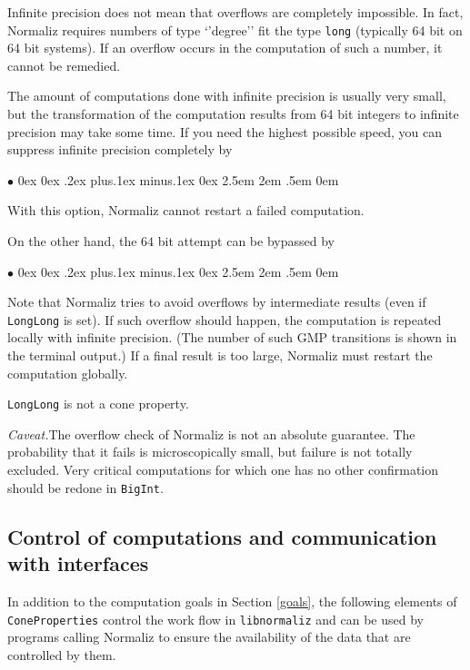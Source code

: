 \documentclass[12pt,a4paper]{scrartcl}
\newcommand{\stdli}{ \topsep0ex \partopsep0ex %
\parsep.2ex plus.1ex minus.1ex \itemsep0ex%
\leftmargin2.5em \labelwidth2em \labelsep.5em \rightmargin0em}%
\renewenvironment{itemize}{\begin{list}{{$\bullet$}}{\stdli}}{\end{list}}
\theoremstyle{definition}
\def\itemtt[#1]{\item[\textbf{\ttt{#1}}]}
\def\ttt{\texttt}
\begin{document}
Infinite precision does not mean that overflows are completely impossible. In fact, Normaliz requires numbers of type `'degree'' fit the type \verb|long| (typically 64 bit on 64 bit systems). If an overflow occurs in the computation of such a number, it cannot be remedied.

The amount of computations done with infinite precision is usually very small, but the transformation of the computation results from 64 bit integers to infinite precision may take some time. If you need the highest possible speed, you can suppress infinite precision completely by 
\begin{itemize}
	\itemtt[LongLong]	
\end{itemize}
With this option, Normaliz cannot restart a failed computation.

On the other hand, the $64$ bit attempt can be bypassed by
\begin{itemize}
	\itemtt[BigInt, -B]	
\end{itemize}

Note that Normaliz tries to avoid overflows by intermediate results (even if \verb|LongLong| is set). If such overflow should happen, the computation is repeated locally with infinite precision. (The number of such GMP transitions is shown in the terminal output.) If a final result is too large, Normaliz must restart the computation globally.

\verb|LongLong| is  not a cone property.

\emph{Caveat.}\enspace The overflow check of Normaliz is not an absolute guarantee. The probability that it fails is microscopically small, but failure is not totally excluded. Very critical computations for which one has no other confirmation should be redone in \verb|BigInt|.

\subsection{Control of computations and communication with interfaces}

In addition to the computation goals in Section \ref{goals}, 
the following elements of \verb|ConeProperties| control the work flow in \verb|libnormaliz| and can be used by programs calling Normaliz to ensure the availability of the data that are controlled by them.
\end{document}
